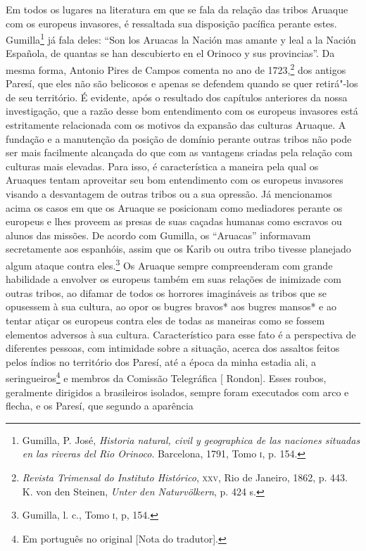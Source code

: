 Em todos os lugares na literatura em que se fala da relação das tribos
Aruaque com os europeus invasores, é ressaltada sua disposição pacífica
perante estes. Gumilla\footnote{Gumilla, P. José, \emph{Historia
  natural, civil y geographica de las naciones situadas en las riveras
  del Rio Orinoco}. Barcelona, 1791, Tomo \textsc{i}, p. 154.} já fala deles:
``Son los Aruacas la Nación mas amante y leal a la Nación Española, de
quantas se han descubierto en el Orinoco y sus provincias''. Da mesma
forma, Antonio Pires de Campos comenta no ano de 1723,\footnote{\emph{Revista
  Trimensal do Instituto Histórico}, \textsc{xxv}, Rio de Janeiro, 1862, p. 443.
  K. von den Steinen, \emph{Unter den Naturvölkern}, p. 424 s.} dos
antigos Paresí, que eles não são belicosos e apenas se defendem quando
se quer retirá"-los de seu território. É evidente, após o resultado dos
capítulos anteriores da nossa investigação, que a razão desse bom
entendimento com os europeus invasores está estritamente relacionada
com os motivos da expansão das culturas Aruaque. A fundação e a
manutenção da posição de domínio perante outras tribos não pode ser mais
facilmente alcançada do que com as vantagens criadas pela relação com
culturas mais elevadas. Para isso, é característica a maneira pela qual
os Aruaques tentam aproveitar seu bom entendimento com os europeus
invasores visando a desvantagem de outras tribos ou a sua opressão. Já
mencionamos acima os casos em que os Aruaque se posicionam como
mediadores perante os europeus e lhes proveem as presas de suas caçadas
humanas como escravos ou alunos das missões. De acordo com Gumilla, os
``Aruacas'' informavam secretamente aos espanhóis, assim que os Karib
ou outra tribo tivesse planejado algum ataque contra eles.\footnote{Gumilla,
  l. c., Tomo \textsc{i}, p, 154.} Os Aruaque sempre
compreenderam com grande habilidade a envolver os europeus também em
suas relações de inimizade com outras tribos, ao difamar de todos os
horrores imagináveis as tribos que se opusessem à sua cultura, ao opor
os bugres bravos* aos bugres mansos* e ao tentar atiçar os europeus
contra eles de todas as maneiras como se fossem elementos adversos à sua
cultura. Característico para esse fato é a perspectiva de diferentes
pessoas, com intimidade sobre a situação, acerca dos assaltos feitos
pelos índios no território dos Paresí, até a época da minha estadia
ali, a seringueiros\footnote[*]{Em português no original {[}Nota do tradutor{]}.} e membros da Comissão Telegráfica {[} Rondon{]}.
Esses roubos, geralmente dirigidos a brasileiros isolados, sempre foram
executados com arco e flecha, e os Paresí, que segundo a aparência
